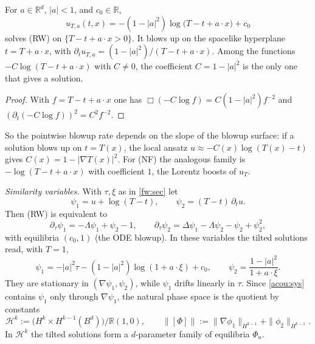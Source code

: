 \begin{lemma}\label{acou:lem-tilt}
For $a\in\mathbb R^d$, $|a|<1$, and $c_0\in\mathbb R$,
\[
  u_{T,a}(t,x)=-(1-|a|^2)\log\big(T-t+a\cdot x\big)+c_0
\]
solves (RW) on $\{T-t+a\cdot x>0\}$. It blows up on the spacelike hyperplane
$t=T+a\cdot x$, with $\partial_tu_{T,a}=(1-|a|^2)/(T-t+a\cdot x)$. Among the
functions $-C\log(T-t+a\cdot x)$ with $C\ne0$, the coefficient $C=1-|a|^2$ is the only one that gives a solution.
\end{lemma}
\begin{proof}
With $f=T-t+a\cdot x$ one has $\Box(-C\log f)=C(1-|a|^2)f^{-2}$ and
$(\partial_t(-C\log f))^2=C^2f^{-2}$.
\end{proof}
So the pointwise blowup rate depends on the slope of the blowup surface: if
a solution blows up on $t=T(x)$, the local ansatz $u\approx-C(x)\log(T(x)-t)$
gives $C(x)=1-|\nabla T(x)|^2$. For (NF) the analogous family is
$-\log(T-t+a\cdot x)$ with coefficient $1$, the Lorentz boosts of $u_T$.

\emph{Similarity variables.} With $\tau,\xi$ as in \cref{fw:sec} let
\[
  \psi_1=u+\log(T-t),\qquad \psi_2=(T-t)\,\partial_tu .
\]
Then (RW) is equivalent to
\begin{equation}\label{acou:sys}
  \partial_\tau\psi_1=-\Lambda\psi_1+\psi_2-1,\qquad
  \partial_\tau\psi_2=\Delta\psi_1-\Lambda\psi_2-\psi_2+\psi_2^2 ,
\end{equation}
with equilibria $(c_0,1)$ (the ODE blowup). In these variables the tilted
solutions read, with $T=1$,
\begin{equation}\label{acou:tilt-sim}
  \psi_1=-|a|^2\tau-(1-|a|^2)\log(1+a\cdot\xi)+c_0,\qquad
  \psi_2=\frac{1-|a|^2}{1+a\cdot\xi}.
\end{equation}
They are stationary in $(\nabla\psi_1,\psi_2)$, while $\psi_1$ drifts
linearly in $\tau$. Since \eqref{acou:sys} contains $\psi_1$ only through
$\nabla\psi_1$, the natural phase space is the quotient by constants
\[
  \mathcal H^k:=\big(H^k\times H^{k-1}(B^d)\big)\big/\mathbb R(1,0),\qquad
  \|[\Phi]\|:=\|\nabla\phi_1\|_{H^{k-1}}+\|\phi_2\|_{H^{k-1}} .
\]
In $\mathcal H^k$ the tilted solutions form a $d$-parameter family of
equilibria $\Phi_a$.

